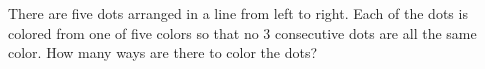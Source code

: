 There are five dots arranged in a line from left to right. Each of the dots is colored from one of five colors so that no $3$ consecutive dots are all the same color. How many ways are there to color the dots?